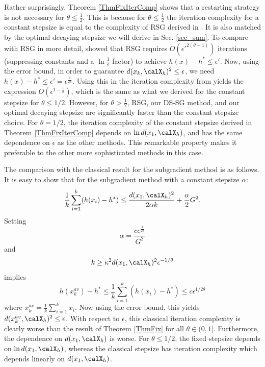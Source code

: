 \documentclass[smallextended]{svjour3}
\begin{document}
  Rather surprisingly, Theorem \ref{ThmFixIterComp} shows that a restarting strategy is not necessary for $\theta\leq\frac{1}{2}$. This is because for $\theta\leq\frac{1}{2}$ the iteration complexity for a constant stepsize is equal to the complexity of RSG derived in \cite{yang2015rsg}. It is also matched by the optimal decaying stepsize we will derive in Sec. \ref{sec_sum}. 
     To compare with RSG in more detail, \cite{yang2015rsg} showed that RSG requires $O(\epsilon'^{2(\theta-1)})$ iterations (suppressing constants and a $\ln\frac{1}{\epsilon}$ factor) to achieve $h(x)-h^*\leq\epsilon'$. Now, using the error bound, in order to guarantee $d(x_k,\calX_h)^2\leq\epsilon$, we need $h(x)-h^*\leq \epsilon'=\epsilon^{\frac{1}{2\theta}}$. Using this in the iteration complexity from \cite{yang2015rsg} yields the expression $O(\epsilon^{1-\frac{1}{\theta}})$, which is the same as what we derived for the constant stepsize for $\theta\leq 1/2$. However, for $\theta>\frac{1}{2}$, RSG, our DS-SG method, and our optimal decaying stepsize are significantly faster than the constant stepsize choice.
     For $\theta=1/2$, the iteration complexity of the constant stepsize derived in Theorem \ref{ThmFixIterComp} depends on $\ln d(x_1,\calX_h)$, and has the same dependence on $\epsilon$ as the other methods. This remarkable property makes it preferable to the other more sophisticated methods in this case. %
    
    The comparison with the classical result for the subgradient method is as follows. It is easy to show that for the subgradient method with a constant stepsize $\alpha$:
    \begin{eqnarray*}
    \frac{1}{k}\sum_{i=1}^k(h(x_i)-h^*)
    \leq
    \frac{d(x_1,\calX_h)^2}{2\alpha k}+\frac{\alpha}{2}G^2.
    \end{eqnarray*}
    Setting 
    $$\alpha=\frac{c\epsilon^{\frac{1}{2\theta}}}{G^2}
    $$
     and 
    \begin{eqnarray*}\label{classicalIter}
   k\geq \kappa^2 d(x_1,\calX_h)^2\epsilon^{-1/\theta}
    \end{eqnarray*} 
    implies 
    $$
    h(x_k^{av})-h^*\leq \frac{1}{k}\sum_{i=1}^k(h(x_i)-h^*)\leq  c\epsilon^{1/2\theta}
    $$ 
    where $x_k^{av}=\frac{1}{k}\sum_{i=1}^k x_i$. Now using the error bound, this yields $d(x_k^{av},\calX_h)^2\leq\epsilon$. With respect to $\epsilon$, this classical iteration complexity is clearly worse than the result of Theorem \ref{ThmFix} for all $\theta\in(0,1]$. Furthermore, the dependence on $d(x_1,\calX_h)$ is worse. For $\theta\leq1/2$, the fixed stepsize depends on $\ln d(x_1,\calX_h)$, whereas the classical stepsize has iteration complexity which depends linearly on $d(x_1,\calX_h)$. 
    
\end{document}
